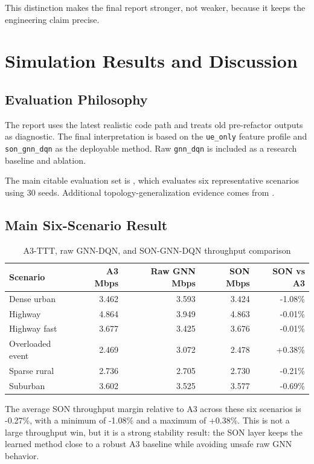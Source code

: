 \documentclass[12pt,a4paper]{report}
\newcommand{\method}{\texttt{son\_gnn\_dqn}}
\newcommand{\rawmethod}{\texttt{gnn\_dqn}}
\newcommand{\ueonly}{\texttt{ue\_only}}
\begin{document}
This distinction makes the final report stronger, not weaker, because it keeps the engineering claim precise.

\chapter{Simulation Results and Discussion}

\section{Evaluation Philosophy}
The report uses the latest realistic code path and treats old pre-refactor outputs as diagnostic. The final interpretation is based on the \ueonly{} feature profile and \method{} as the deployable method. Raw \rawmethod{} is included as a research baseline and ablation.

The main citable evaluation set is , which evaluates six representative scenarios using 30 seeds. Additional topology-generalization evidence comes from .

\section{Main Six-Scenario Result}
\begin{table}[H]
\centering
\caption{A3-TTT, raw GNN-DQN, and SON-GNN-DQN throughput comparison}
\begin{tabularx}{\textwidth}{p{}r r r r}
\toprule
\textbf{Scenario} & \textbf{A3 Mbps} & \textbf{Raw GNN Mbps} & \textbf{SON Mbps} & \textbf{SON vs A3}\\
\midrule
Dense urban & 3.462 & 3.593 & 3.424 & -1.08\%\\
Highway & 4.864 & 3.949 & 4.863 & -0.01\%\\
Highway fast & 3.677 & 3.425 & 3.676 & -0.01\%\\
Overloaded event & 2.469 & 3.072 & 2.478 & +0.38\%\\
Sparse rural & 2.736 & 2.705 & 2.730 & -0.21\%\\
Suburban & 3.602 & 3.525 & 3.577 & -0.69\%\\
\bottomrule
\end{tabularx}
\end{table}

The average SON throughput margin relative to A3 across these six scenarios is -0.27\%, with a minimum of -1.08\% and a maximum of +0.38\%. This is not a large throughput win, but it is a strong stability result: the SON layer keeps the learned method close to a robust A3 baseline while avoiding unsafe raw GNN behavior.
\end{document}
